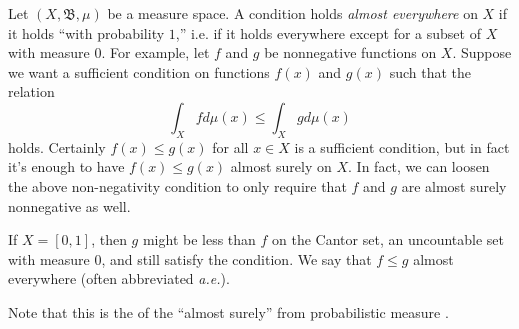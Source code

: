 \documentclass[12pt]{article}
\newcommand{\borel}{\mathfrak{B}}
\begin{document}
Let $(X, \borel, \mu)$ be a measure space.  A condition holds \emph{almost everywhere} on $X$ if it holds ``with probability $1$,'' i.e. if it holds everywhere except for a subset of $X$ with measure $0$.  For example, let $f$ and $g$ be nonnegative functions on $X$.  Suppose we want a sufficient condition on functions $f(x)$ and $g(x)$ such that the relation
\begin{equation}
\int_{X} f d\mu(x) \le \int_{X} g d\mu(x) 
\end{equation}
holds.  Certainly $f(x)\leq g(x)$ for all $x\in X$ is a sufficient condition, but in fact it's enough to have $f(x)\leq g(x)$ almost surely on $X$.  In fact, we can loosen the above non-negativity condition to only require that $f$ and $g$ are almost surely nonnegative as well.

If $X = [0,1]$, then $g$ might be less than $f$ on the Cantor set, an uncountable set with measure $0$, and still satisfy the condition.  We say that $f \le g$ almost everywhere (often abbreviated \emph{a.e.}).   

Note that this  is the  of the  ``almost surely'' from probabilistic measure .
\end{document}
